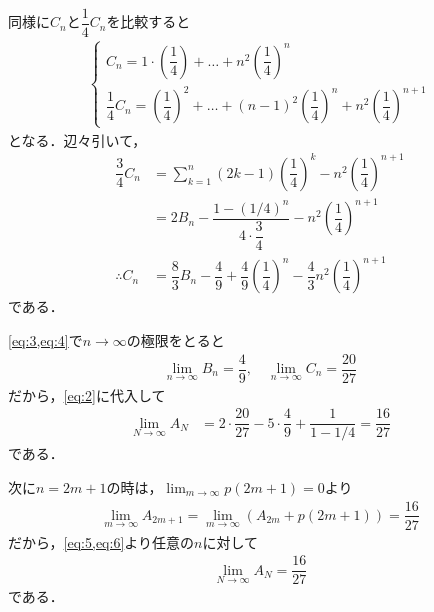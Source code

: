 \documentclass[../../main.tex]{subfiles}
\begin{document}
同様に$C_n$と$\dfrac{1}{4}C_n$を比較すると
\begin{align}
  \begin{cases}
    C_n  = 1 \cdot \left(\dfrac{1}{4}\right) + \dots + n^2 \left(\dfrac{1}{4}\right)^n \\
    \dfrac{1}{4} C_n = \left(\dfrac{1}{4}\right)^2 + \dots + (n-1)^2 \left(\dfrac{1}{4}\right)^n + n^2 \left(\dfrac{1}{4}\right)^{n+1}
  \end{cases}
\end{align}
となる．辺々引いて，
\begin{align}
  \dfrac{3}{4} C_n
  &= \sum_{k=1}^n (2k-1) \left(\dfrac{1}{4}\right)^k  - n^2 \left(\dfrac{1}{4}\right)^{n+1} \\
  &= 2 B_n - \dfrac{1 - (1/4)^n}{4 \cdot \dfrac{3}{4}} - n^2 \left(\dfrac{1}{4}\right)^{n+1} \\
  \therefore
  C_n
  &= \dfrac{8}{3} B_n - \dfrac{4}{9} + \dfrac{4}{9} \left(\dfrac{1}{4}\right)^n
  - \dfrac{4}{3} n^2 \left(\dfrac{1}{4}\right)^{n+1} \label{eq:4}
\end{align}
である．

\cref{eq:3,eq:4}で$n\to\infty$の極限をとると
\begin{align}
  \lim_{n\to\infty}B_n = \dfrac{4}{9}, \quad \lim_{n\to\infty}C_n = \dfrac{20}{27}
\end{align}
だから，\cref{eq:2}に代入して
\begin{align}
  \lim_{N\to\infty} A_N
  &=  2 \cdot \dfrac{20}{27} - 5 \cdot \dfrac{4}{9} + \dfrac{1}{1-1/4}
  = \dfrac{16}{27} \label{eq:5}
\end{align}
である．

次に$n=2m+1$の時は，$\lim_{m\to\infty}p(2m+1)=0$より
\begin{align}
  \lim_{m\to\infty} A_{2m+1} = \lim_{m\to\infty} (A_{2m} + p(2m+1)) = \dfrac{16}{27} \label{eq:6}
\end{align}
だから，\cref{eq:5,eq:6}より任意の$n$に対して
\begin{align}
  \lim_{N\to\infty} A_N = \dfrac{16}{27}
\end{align}
である．
\end{document}
